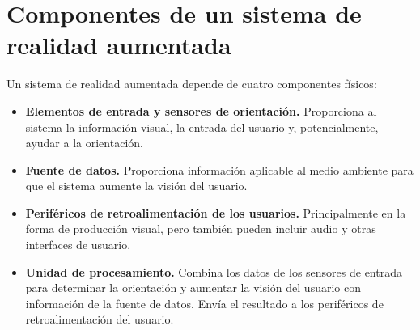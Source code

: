 


\section{Componentes de un sistema de realidad aumentada}
Un sistema de realidad aumentada depende de cuatro componentes físicos:

\begin{itemize}

\item \textbf{Elementos de entrada y sensores de orientación.} Proporciona al sistema la información visual, la entrada del usuario y, potencialmente, ayudar a la orientación.

\item \textbf{Fuente de datos.} Proporciona información aplicable al medio ambiente para que el sistema aumente la visión del usuario.

\item \textbf{Periféricos de retroalimentación de los usuarios.} Principalmente en la forma de producción visual, pero también pueden incluir audio y otras interfaces de usuario.

\item \textbf{Unidad de procesamiento.} Combina los datos de los sensores de entrada para determinar la orientación y aumentar la visión del usuario con información de la fuente de datos. Envía el resultado a los periféricos de retroalimentación del usuario.

\end{itemize}

